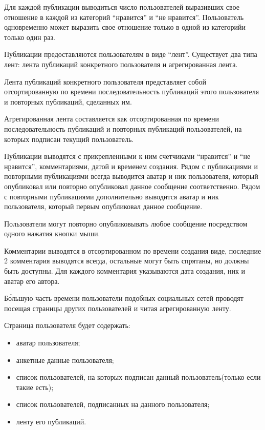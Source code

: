 Для каждой публикации выводиться число пользователей выразивших свое отношение
в каждой из категорий ``нравится'' и ``не нравится''.
Пользователь одновременно может выразить свое отношение только в одной из категорийи только один раз.

Публикации предоставляются пользователям в виде ``лент''.
Существует два типа лент: лента публикаций конкретного пользователя и 
агрегированная лента.

Лента публикаций конкретного пользователя представляет собой отсортированную 
по времени последовательность публикаций этого пользователя и повторных
публикаций, сделанных им.

Агрегированная лента составляется как отсортированная по времени
последовательность публикаций и повторных публикаций пользователей,
на которых подписан текущий пользователь. 

Публикации выводятся с прикрепленными к ним 
счетчиками ``нравится'' и ``не нравится'', комментариями, датой и временем создания.
Рядом с публикациями и повторными публикациями всегда выводится аватар и ник
пользователя, который опубликовал или повторно опубликовал данное
сообщение соответственно.
Рядом с повторными публикациями дополнительно выводится аватар и ник пользователя,
который первым опубликовал данное сообщение.

Пользователи могут повторно опубликовывать любое сообщение посредством одного
нажатия кнопки мыши.



Комментарии выводятся в отсортированном по времени создания виде,
последние 2 комментария выводятся всегда,
остальные могут быть спрятаны, но должны быть доступны.
Для каждого комментария указываются дата создания, ник и аватар его автора.

Б\'{о}льшую часть времени пользователи подобных социальных сетей проводят
посещая страницы других пользователей и читая агрегированную ленту.

Страница пользователя будет содержать:
\begin{itemize}
\item аватар пользователя;
\item анкетные данные пользователя;
\item список пользователей, на которых подписан данный пользователь(только если такие есть);
\item список пользователей, подписанных на данного пользователя;
\item ленту его публикаций.
\end{itemize}


